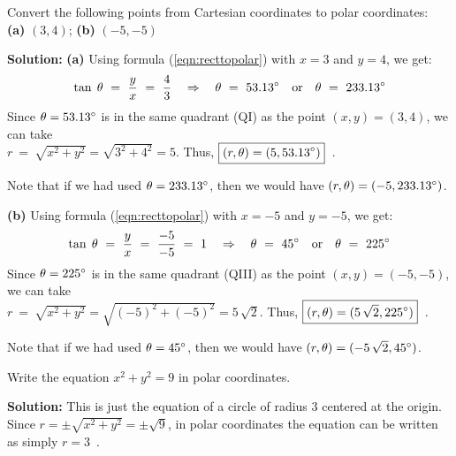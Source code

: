 \begin{exmp}
Convert the following points from Cartesian coordinates to polar coordinates:\\
\textbf{(a)} $(3,4)$; \textbf{(b)} $(-5,-5)$\vspace{1mm}
\par\noindent\textbf{Solution:} \textbf{(a)} Using formula (\ref{eqn:recttopolar}) with $x=3$ and
$y=4$, we get:
\begin{displaymath}
 \tan\;\theta ~=~ \frac{y}{x} ~=~ \frac{4}{3} \quad\Rightarrow\quad \theta ~=~ 53.13^\circ \quad
 \text{or}\quad \theta ~=~ 233.13^\circ
\end{displaymath}
Since $\theta = 53.13^\circ$ is in the same quadrant (QI) as the point $(x,y) = (3,4)$, we can
take\\$r ~=~ \sqrt{x^2 + y^2} = \sqrt{3^2 + 4^2} = 5$. Thus, $\boxed{(r,\theta) = (5,53.13^\circ)}$~.

\noindent Note that if we had used $\theta = 233.13^\circ$, then we would have $(r,\theta) =
(-5,233.13^\circ)$.

\par\noindent\textbf{(b)}  Using formula (\ref{eqn:recttopolar}) with $x=-5$ and $y=-5$, we get:
\begin{displaymath}
 \tan\;\theta ~=~ \frac{y}{x} ~=~ \frac{-5}{-5} ~=~ 1 \quad\Rightarrow\quad \theta ~=~ 45^\circ \quad
 \text{or}\quad \theta ~=~ 225^\circ
\end{displaymath}
Since $\theta = 225^\circ$ is in the same quadrant (QIII) as the point $(x,y) = (-5,-5)$, we can
take\\$r ~=~ \sqrt{x^2 + y^2} = \sqrt{(-5)^2 + (-5)^2} = 5\,\sqrt{2}$. Thus, $\boxed{(r,\theta) =
(5\,\sqrt{2},225^\circ)}$~.

\noindent Note that if we had used $\theta = 45^\circ$, then we would have $(r,\theta) =
(-5\,\sqrt{2},45^\circ)$.
\end{exmp}
\begin{exmp}\label{exmp:polarcircle}
 Write the equation $x^2 + y^2 = 9$ in polar coordinates.\vspace{1mm}
 \par\noindent\textbf{Solution:} This is just the equation of a circle of radius $3$ centered at the
 origin. Since $r = \pm\sqrt{x^2 + y^2} = \pm\sqrt{9}$, in polar coordinates the equation can be written
 as simply $\boxed{r = 3}$~.
\end{exmp}
